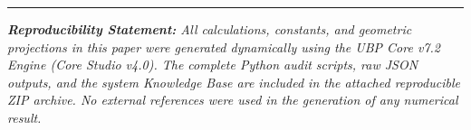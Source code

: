 \documentclass[12pt,a4paper]{article}
\begin{document}
\vspace{1cm}
\hrule
\vspace{0.3cm}
\noindent\textit{\textbf{Reproducibility Statement:} All calculations, constants, and geometric projections in this paper were generated dynamically using the UBP Core v7.2 Engine (Core Studio v4.0). The complete Python audit scripts, raw JSON outputs, and the system Knowledge Base are included in the attached reproducible ZIP archive. No external references were used in the generation of any numerical result.}
\end{document}

